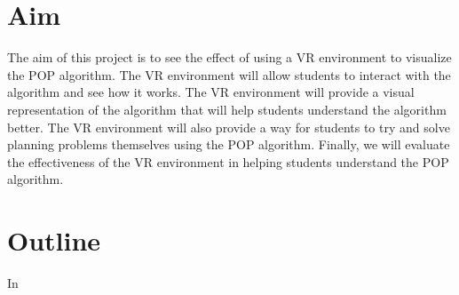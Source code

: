 \section{Aim}

The aim of this project is to see the effect of using a \ac{VR} environment to visualize the \ac{POP} algorithm. The \ac{VR} environment will allow students to interact with the algorithm and see how it works. The \ac{VR} environment will provide a visual representation of the algorithm that will help students understand the algorithm better. The \ac{VR} environment will also provide a way for students to try and solve planning problems themselves using the \ac{POP} algorithm. Finally, we will evaluate the effectiveness of the \ac{VR} environment in helping students understand the \ac{POP} algorithm.

\section{Outline}
In


